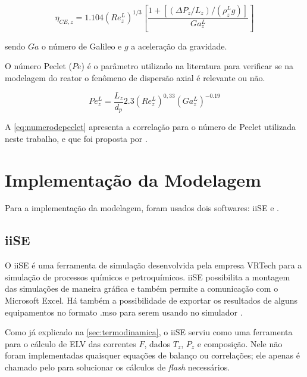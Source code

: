 \begin{equation}
\eta_{CE,z} = 1.104(Re_z^L)^{1/3} \left [
\dfrac{1 + [(\Delta P_z/L_{z})/(\rho_{z}^L g)]}{Ga_{z}^{L}} \right ]
\label{eq:molhamento}
\end{equation}

sendo $Ga$ o número de Galileo e $g$ a aceleração da gravidade.


O número Peclet ($Pe$) é o parâmetro utilizado na literatura para verificar
se na modelagem do reator o fenômeno de dispersão axial é relevante ou não.

\begin{equation}
Pe_z^L = \dfrac{L_z}{d_p} 2.3(Re_z^L)^{0,33}(Ga_{z}^{L})^{-0.19}
\label{eq:numerodepeclet}
\end{equation}

A \autoref{eq:numerodepeclet} apresenta a correlação para o número de
Peclet utilizada neste trabalho, e que foi proposta por
.


\section{Implementação da Modelagem} \label{sec:implementacao}

Para a implementação da modelagem, foram usados dois softwares: iiSE e \emso. 

\subsection{iiSE} \label{sec:iise}

O iiSE é uma ferramenta de simulação desenvolvida pela empresa VRTech para a
simulação de processos químicos e petroquímicos. iiSE possibilita a
montagem das simulações de maneira gráfica e também permite a comunicação
com o Microsoft Excel. Há também a possibilidade de exportar os resultados
de alguns equipamentos no formato .mso para serem usando no simulador \emso.

Como já explicado na \autoref{sec:termodinamica}, o iiSE serviu como uma
ferramenta para o cálculo de ELV das correntes $F$, dados $T_z$, $P_z$ e
composição. Nele não foram implementadas quaisquer equações de balanço ou
correlações; ele apenas é chamado pelo \emso para solucionar os cálculos de
\emph{flash} necessários.

